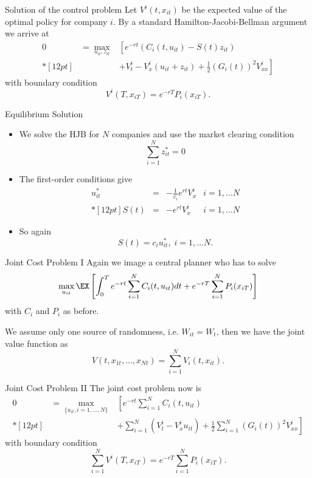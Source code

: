 {Solution of the control problem}
Let $V^i(t,x_{it})$ be the expected value of the optimal policy for company $i$. By a standard
Hamilton-Jacobi-Bellman argument we arrive at
$$
\begin{array}{lll}
0&=\max_{u_{it},z_{it}}&\left[e^{-rt}(C_i(t,u_{it}) - S(t) z_{it})\right.\\*[12pt]
&&+\left.V^i_t -V_x^i(u_{it}+z_{it}) + \frac{1}{2}(G_i(t))^2 V^i_{xx}\right]
\end{array}
$$
with boundary condition
$$
V^i(T, x_{iT})=e^{-rT}P_i(x_{iT}).
$$



{Equilibrium Solution}
\begin{itemize}
\item<1-> We solve the HJB for $N$ companies and use the market clearing condition
$$
\sum_{i=1}^N z_{it}^*=0
$$
\item<2-> The first-order conditions give
$$
\begin{array}{llll}
u_{it}^* &=& -\frac{1}{c_i} e^{rt} V^i_x & i=1, \ldots N \\*[12pt]
S(t) &=& - e^{rt} V^i_{x} & i=1, \ldots N
\end{array}
$$
\item<3-> So again
$$
S(t) = c_i u_{it}^*, \; i=1, \ldots N.
$$
\end{itemize}


{Joint Cost Problem I}
Again we image a central planner who has to solve
\begin{equation}
\max_{u_{it}} \EX\left[\int_0^Te^{-rt}\sum_{i=1}^N C_i(t,u_{it})dt + e^{-rT} \sum_{i=1}^N P_i(x_{iT})\right]
\end{equation}
with $C_i$ and $P_i$ as before.

We assume only one source of randomness, i.e. $W_{it}= W_t$, then we have the  joint value function as
$$
V(t, x_{1t}, \ldots, x_{Nt}) = \sum_{i=1}^N V_i(t,x_{it}).
$$




{Joint Cost Problem II}
The joint cost problem now is
$$
\begin{array}{lll}
0&=\displaystyle \max_{\{u_{it},i=1, \ldots, N\}}&\displaystyle \left[e^{-rt}\sum_{i=1}^N C_i(t,u_{it})\right.\\*[12pt]
&&+\displaystyle \left.\sum_{i=1}^N (V^i_t -V_x^iu_{it}) + \frac{1}{2}\sum_{i=1}^N(G_i(t))^2 V^i_{xx}\right]
\end{array}
$$
with boundary condition
$$
\sum_{i=1}^N V^i(T, x_{iT})=e^{-rT}\sum_{i=1}^N P_i(x_{iT}).
$$



